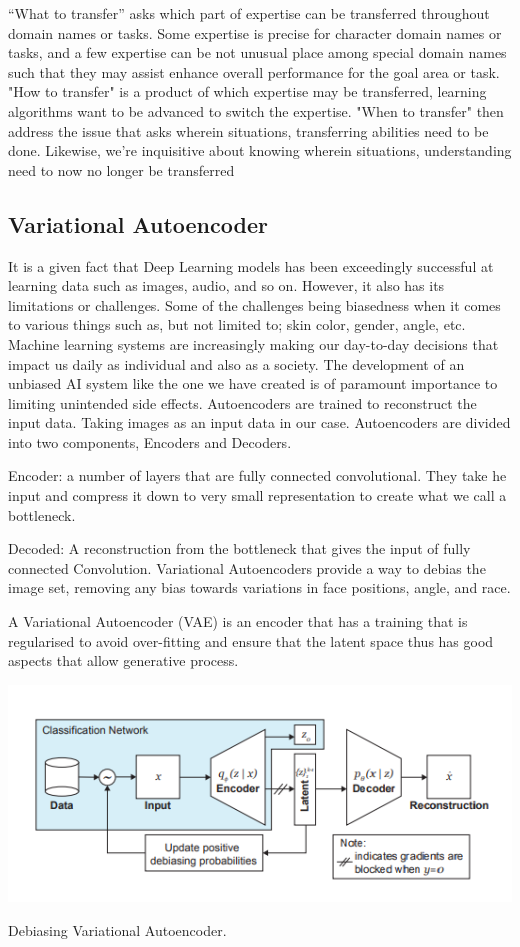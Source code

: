 “What to transfer” asks which part of expertise can
be transferred throughout domain names or tasks. Some expertise is
precise for character domain names or tasks, and a few expertise
can be not unusual place among special domain names such that they may
assist enhance overall performance for the goal area or task. "How to transfer" is a product of which expertise may be transferred, learning
algorithms want to be advanced to switch the expertise. "When to transfer" then address the issue that asks wherein situations, transferring
abilities need to be done. Likewise, we're inquisitive about knowing
wherein situations, understanding need to now no longer be transferred


\subsection{Variational Autoencoder}

 It is a given fact that Deep Learning models has been exceedingly successful at learning data such as images, audio, and so on. However, it also has its limitations
 or challenges. Some of the challenges being biasedness when it comes to various things such as, but not limited to; skin color, gender, angle, etc. 
 Machine learning systems are increasingly making our day-to-day decisions that impact us daily as individual and also as a society. The development of an unbiased AI system
 like the one we have created is of paramount importance to limiting unintended side effects. \cite{amini2019uncovering} 
 Autoencoders are trained to reconstruct the input data. Taking images as an input data in our case.
 Autoencoders are divided into two components, Encoders and Decoders.
 \item Encoder: a number of layers that are fully connected convolutional. They take he input and compress it down to very small representation
 to create what we call a bottleneck. 
 \item Decoded: A reconstruction from the bottleneck that gives the input of fully connected Convolution.
Variational Autoencoders provide a way to debias the image set, removing any bias towards variations in face positions, angle, and race.


A Variational Autoencoder (VAE) is an encoder that has a training that is regularised to avoid over-fitting and ensure that the 
latent space thus has good aspects that allow generative process.  

\includegraphics[width=.6\textwidth,height=.7\textheight,keepaspectratio]{tex/images/vae.png}
\caption{Debiasing Variational Autoencoder.}

